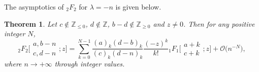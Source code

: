 \documentclass[pdftex]{sigma}
\numberwithin{equation}{section}
\newtheorem{Theorem}{Theorem}[section]
\newcommand{\ZZ}{\ensuremath{\mathbb{Z}}}
\newcommand{\mo}{\mathcal{O}}
\begin{document}
The asymptotics of $_2F_2$ for $\lambda=-n$ is given below.
\begin{Theorem}\label{Thm: 2F2 large parameter--n}
	Let $c\notin\ZZ_{\leqslant 0}$, $d\notin\ZZ$, $b-d\notin\ZZ_{\geqslant 0}$ and $z\ne 0$. Then for any positive integer $N$,
	\begin{equation}\label{2F2 large parameter--n}
		{}_2F_2\biggl[\begin{matrix}
			a,b-n\\
			c,d-n
		\end{matrix};z\biggr]=\sum_{k=0}^{N-1}\frac{(a)_k(d-b)_k}{(c)_k(d-n)_k}\frac{(-z)^k}{k!}{}_1F_1\biggl[\begin{matrix}
			a+k\\
			c+k
		\end{matrix};z\biggr]+\mo\big(n^{-N}\big),
	\end{equation}
	where $n\to +\infty$ through integer values.
\end{Theorem}
\end{document}
